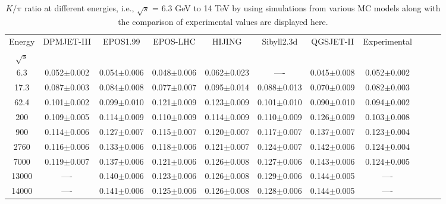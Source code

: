 


%

\begin{table*}[!htb]\label{tab3}
{
\begin{center}
\caption{$K/\pi$ ratio at different energies, i.e., $\sqrt{s}$ = 6.3 GeV to 14 TeV by using simulations from various MC models along with the comparison of experimental values are displayed here.}
\small

\begin{tabular}{ccccccccccc}\\ \hline\hline
 Energy&DPMJET-III& EPOS1.99 & EPOS-LHC  &HIJING &Sibyll2.3d& QGSJET-II & Experimental  \\
 $\sqrt{s}$  &     & &&&& \\
\hline
    6.3  & 0.052$\pm$0.002 & 0.054$\pm$0.006 & 0.048$\pm$0.006& 0.062$\pm$0.023
 & ---- & 0.045$\pm$0.008&0.052$\pm$0.002\\
    17.3 & 0.087$\pm$0.003 & 0.084$\pm$0.008 & 0.077$\pm$0.007 & 0.095$\pm$0.014& 0.088$\pm$0.013 & 0.070$\pm$0.009 &0.082$\pm$0.003\\
    62.4 & 0.101$\pm$0.002 & 0.099$\pm$0.010 & 0.121$\pm$0.009 & 0.123$\pm$0.009 & 0.101$\pm$0.010 & 0.090$\pm$0.010 &0.094$\pm$0.002\\
    200 & 0.109$\pm$0.005 & 0.114$\pm$0.009 & 0.110$\pm$0.009 & 0.114$\pm$0.009 & 0.110$\pm$0.009 &0.126$\pm$0.009&0.103$\pm$0.008\\
    900 &  0.114$\pm$0.006 & 0.127$\pm$0.007 & 0.115$\pm$0.007 & 0.120$\pm$0.007  &  0.117$\pm$0.007 &0.137$\pm$0.007&0.123$\pm$0.004 \\
    2760 &  0.116$\pm$0.006 & 0.133$\pm$0.006 & 0.118$\pm$0.006 & 0.121$\pm$0.007 & 0.124$\pm$0.007 & 0.142$\pm$0.006&0.124$\pm$0.004\\
    7000 &  0.119$\pm$0.007 & 0.137$\pm$0.006 & 0.121$\pm$0.006 &  0.126$\pm$0.008 & 0.127$\pm$0.006& 0.143$\pm$0.006&0.124$\pm$0.005\\
    13000 & ----&  0.140$\pm$0.006 & 0.123$\pm$0.006 & 0.126$\pm$0.008
 &  0.129$\pm$0.006 & 0.144$\pm$0.005&----\\
    14000 & ---- &0.141$\pm$0.006 & 0.125$\pm$0.006 & 0.126$\pm$0.008 & 0.128$\pm$0.006 & 0.144$\pm$0.005 &----\\
\hline
\end{tabular}%
\end{center}}
\end{table*}

%
